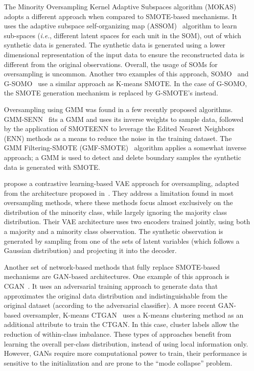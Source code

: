 The Minority Oversampling Kernel Adaptive Subspaces algorithm
(MOKAS)~\cite{lin2017minority} adopts a different approach when compared to
SMOTE-based mechanisms. It uses the adaptive subspace self-organizing map
(ASSOM)~\cite{kohonen1996emergence} algorithm to learn sub-spaces
(\textit{i.e.}, different latent spaces for each unit in the SOM), out of
which synthetic data is generated. The synthetic data is generated using a
lower dimensional representation of the input data to ensure the reconstructed
data is different from the original observations. Overall, the usage of SOMs
for oversampling is uncommon. Another two examples of this approach,
SOMO~\cite{Douzas2017} and G-SOMO~\cite{douzas2021g} use a similar
approach as K-means SMOTE\@. In the case of G-SOMO, the SMOTE
generation mechanism is replaced by G-SMOTE's instead.

Oversampling using GMM was found in a few recently proposed algorithms.
GMM-SENN~\cite{xing2022predict} fits a GMM and uses its inverse weights to
sample data, followed by the application of SMOTEENN to leverage the Edited
Nearest Neighbors (ENN) methods as a means to reduce the noise in the training
dataset. The GMM Filtering-SMOTE (GMF-SMOTE)~\cite{xu2022synthetic} algorithm
applies a somewhat inverse approach; a GMM is used to detect and delete
boundary samples the synthetic data is generated with SMOTE.

\citet{dai2019generative} propose a contrastive learning-based VAE approach
for oversampling, adapted from the architecture proposed
in~\cite{abid2019contrastive}. They address a limitation found in most
oversampling methods, where these methods focus almost exclusively on the
distribution of the minority class, while largely ignoring the majority class
distribution. Their VAE architecture uses two encoders trained jointly, using
both a majority and a minority class observation. The synthetic observation is
generated by sampling from one of the sets of latent variables (which follows
a Gaussian distribution) and projecting it into the decoder.

Another set of network-based methods that fully replace SMOTE-based mechanisms
are GAN-based architectures. One example of this approach is
CGAN~\cite{douzas2018effective}. It uses an adversarial training approach to
generate data that approximates the original data distribution and
indistinguishable from the original dataset (according to the adversarial
classifier). A more recent GAN-based oversampler, K-means CTGAN~\cite{an2021k}
uses a K-means clustering method as an additional attribute to train the
CTGAN\@. In this case, cluster labels allow the reduction of within-class
imbalance. These types of approaches benefit from learning the overall
per-class distribution, instead of using local information only. However, GANs
require more computational power to train, their performance is sensitive to
the initialization and are prone to the ``mode collapse'' problem.

